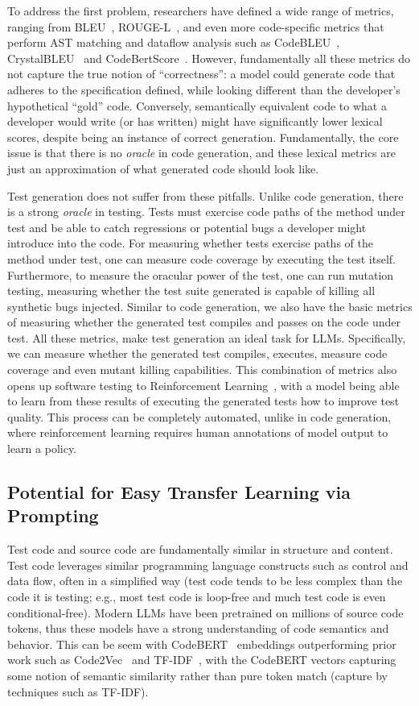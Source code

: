 \documentclass[sigconf,natbib=false]{acmart}
\begin{document}
\noindent  To address the first problem, researchers have defined a wide 
range of metrics, ranging from BLEU~\cite{BLEU}, ROUGE-L~\cite{ROUGE}, and even more code-specific metrics that perform 
AST matching and dataflow analysis such as CodeBLEU~\cite{CodeBLEU}, CrystalBLEU~\cite{CrystalBLEU} and CodeBertScore~\cite{CodeBERTScore}.
However, fundamentally all these metrics do not capture the true notion of ``correctness'': a model could generate code that adheres to the 
specification defined, while looking different than the developer's
hypothetical ``gold'' code. Conversely, semantically equivalent code
to what a developer would write (or has written) might have significantly lower lexical scores, despite being an instance of correct generation. Fundamentally, the core issue is that there 
is no \emph{oracle} in code generation, and these lexical metrics are just an approximation of what generated code should look like.

Test generation does not suffer from these pitfalls. Unlike code generation, there is a strong \emph{oracle} in testing. Tests must exercise code 
paths of the method under test and be able to catch regressions or potential bugs a developer might introduce into the code. For measuring whether 
tests exercise paths of the method under test, one can measure code coverage by executing the test itself. Furthermore, to measure the oracular power 
of the test, one can run mutation testing, measuring whether the test suite generated is capable of killing all synthetic bugs injected. Similar to 
code generation, we also have the basic metrics of measuring whether the generated test compiles and passes on the code under test. All these metrics, 
make test generation an ideal task for LLMs. Specifically, we can measure whether the generated test compiles, executes, measure code coverage and 
even mutant killing capabilities. This combination of metrics also opens up software testing to Reinforcement Learning~\cite{rlhf},
with a model being able to learn from these results of executing the generated tests how to improve test quality. This process can be completely automated, 
unlike in code generation, where reinforcement learning requires human annotations of model output to learn a policy.

\subsection{Potential for Easy Transfer Learning via Prompting}

Test code and source code are fundamentally similar in structure and content. Test code leverages similar programming language 
constructs such as control and data flow, often in a simplified way
(test code tends to be less complex than the code it is testing; e.g.,
most test code is loop-free and much test code is even conditional-free).
Modern LLMs have been pretrained on millions of source code tokens, thus these models have a strong understanding of code semantics 
and behavior. This can be seem with CodeBERT~\cite{codebert} embeddings outperforming prior work such as Code2Vec~\cite{code2vec} 
and TF-IDF~\cite{tfidf}, with the CodeBERT vectors capturing some notion of semantic similarity rather than pure token match (capture by techniques 
such as TF-IDF). 
\end{document}

